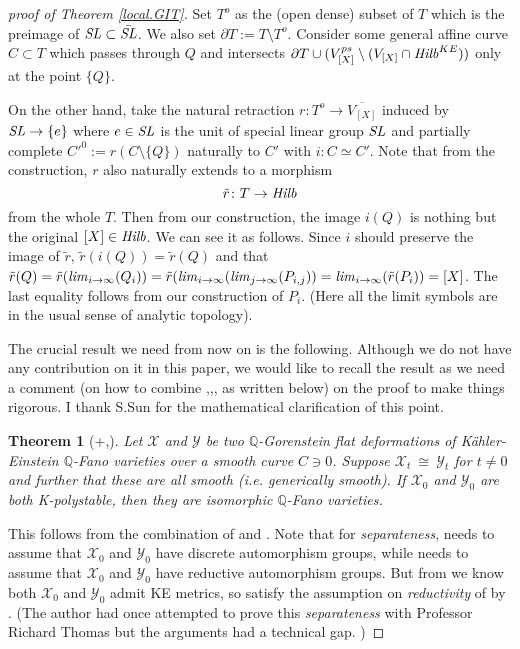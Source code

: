 \documentclass[12pt]{amsart}
\newtheorem{Thm}{Theorem}[section]
\theoremstyle{remark}
\theoremstyle{definition}
\begin{document}
\begin{proof}[proof of Theorem \ref{local.GIT}]
Set $T^{o}$ as the (open dense) subset of $T$ which is the 
preimage of ${\it SL}\subset \bar{\it SL}$. We also set 
$\partial T:=T\setminus T^{o}$. 
Consider some general affine curve $C\subset T$ which passes through $Q$ 
and intersects $\partial T \cup (V_{[X]}^{ps}\setminus (V_{[X]}\cap {\it Hilb}^{KE}))$ only at the point $\{Q\}$. 

On the other hand, take the natural retraction 
$r\colon T^{o}\rightarrow \overline{V_{[X]}}$ 
induced by ${\it SL}\rightarrow \{e\}$ where $e\in {\it SL}$ is the unit of 
special linear group ${\it SL}$ and partially complete  
$C'^{0}:=r(C\setminus\{Q\})$ naturally to $C'$ with $i\colon C\simeq C'$. 
Note that from the construction, $r$ also naturally extends to a morphism 
$$
\tilde{r}\colon T\rightarrow {\it Hilb}
$$
from the whole $T$. 
Then from our construction, 
the image $i(Q)$ is nothing but 
the original $[X]\in {\it Hilb}$. We can see it as follows. 
Since $i$ should preserve the image of $\tilde{r}$, 
$\tilde{r}(i(Q))=\tilde{r}(Q)$ and that 
$\tilde{r}(Q)=\tilde{r}({\it lim}_{i\to \infty}(Q_{i}))
=\tilde{r}({\it lim}_{i\to \infty}({\it lim}_{j\to \infty}(P_{i,j}))
={\it lim}_{i\to \infty}(\tilde{r}(P_{i}))=[X]$. The last equality follows from 
our construction of $P_{i}$. 
(Here all the limit symbols are in the usual sense of analytic topology). 

The crucial result we need from now on is the following. 
Although we do not have any contribution on it 
in this paper, we would like to recall the 
result as we need a comment (on how to combine \cite{LWX},\cite{SSY},\cite{CDS}, 
as written below) on the proof to make things rigorous. 
I thank S.Sun for the mathematical clarification of this point.

\begin{Thm}[{\cite[Thm1.1 of v1]{LWX}+\cite[Thm1.1]{SSY},\cite{CDS}}]\label{sep}
Let $\mathcal{X}$ and $\mathcal{Y}$ be two
$\mathbb{Q}$-Gorenstein flat deformations of K\"ahler-Einstein 
$\mathbb{Q}$-Fano varieties 
over a smooth curve $C\ni 0$. Suppose $\mathcal{X}_t\ \cong\
\mathcal{Y}_t
$ for $t\neq 0$ 
and further that these are all smooth (i.e. generically smooth).  If $\mathcal{X}_0$ and $\mathcal{Y}_0$ are both 
K-polystable, then they are isomorphic $\mathbb{Q}$-Fano varieties.
\end{Thm}

This follows from the combination of \cite[v1]{LWX} and \cite[Theorem 1.1]{SSY}. 
Note that for \emph{separateness}, \cite[Corollary 1.2]{SSY} needs to assume that $\mathcal{X}_0$ and $\mathcal{Y}_0$ have discrete automorphism groups, while \cite[Remark 6.11]{LWX} needs to assume that $\mathcal{X}_0$ and $\mathcal{Y}_0$ have reductive automorphism groups.  But from \cite[Theorem 1.1]{SSY} we know both $\mathcal{X}_0$ and $\mathcal{Y}_0$ admit KE metrics, so satisfy the assumption on \emph{reductivity} of \cite[v1]{LWX} by \cite[III, Theorem 4]{CDS}. 
(The author had once attempted to prove this \emph{separateness} with 
Professor Richard Thomas but the arguments had a 
technical gap. ) 


\end{proof}
\end{document}
